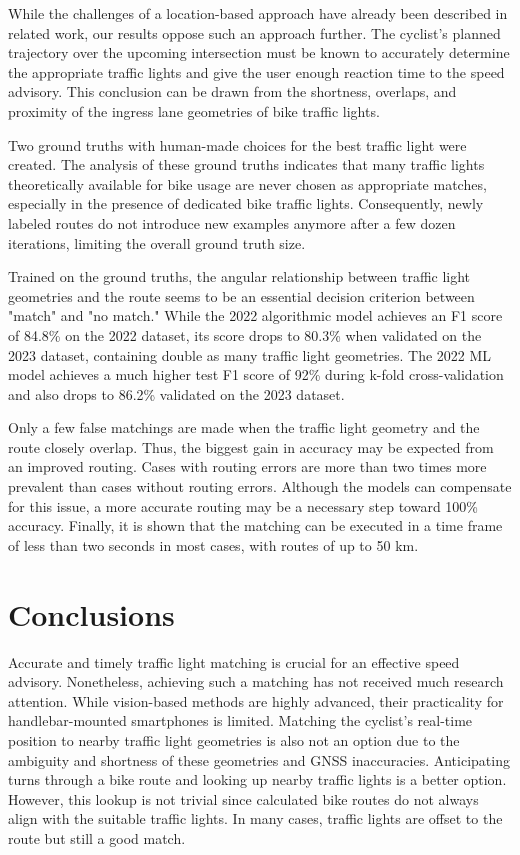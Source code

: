 \begin{Summary}
While the challenges of a location-based approach have already been described in related work, our results oppose such an approach further. The cyclist's planned trajectory over the upcoming intersection must be known to accurately determine the appropriate traffic lights and give the user enough reaction time to the speed advisory. This conclusion can be drawn from the shortness, overlaps, and proximity of the ingress lane geometries of bike traffic lights. 

Two ground truths with human-made choices for the best traffic light were created. The analysis of these ground truths indicates that many traffic lights theoretically available for bike usage are never chosen as appropriate matches, especially in the presence of dedicated bike traffic lights. Consequently, newly labeled routes do not introduce new examples anymore after a few dozen iterations, limiting the overall ground truth size. 

Trained on the ground truths, the angular relationship between traffic light geometries and the route seems to be an essential decision criterion between "match" and "no match." While the 2022 algorithmic model achieves an F1 score of 84.8\% on the 2022 dataset, its score drops to 80.3\% when validated on the 2023 dataset, containing double as many traffic light geometries. The 2022 ML model achieves a much higher test F1 score of 92\% during k-fold cross-validation and also drops to 86.2\% validated on the 2023 dataset. 

Only a few false matchings are made when the traffic light geometry and the route closely overlap. Thus, the biggest gain in accuracy may be expected from an improved routing. Cases with routing errors are more than two times more prevalent than cases without routing errors. Although the models can compensate for this issue, a more accurate routing may be a necessary step toward 100\% accuracy. Finally, it is shown that the matching can be executed in a time frame of less than two seconds in most cases, with routes of up to 50 km. 
\end{Summary}

\section{Conclusions}

Accurate and timely traffic light matching is crucial for an effective speed advisory. Nonetheless, achieving such a matching has not received much research attention. While vision-based methods are highly advanced, their practicality for handlebar-mounted smartphones is limited. Matching the cyclist's real-time position to nearby traffic light geometries is also not an option due to the ambiguity and shortness of these geometries and GNSS inaccuracies. Anticipating turns through a bike route and looking up nearby traffic lights is a better option. However, this lookup is not trivial since calculated bike routes do not always align with the suitable traffic lights. In many cases, traffic lights are offset to the route but still a good match.

